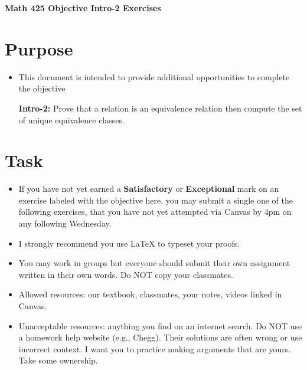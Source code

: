 \documentclass[12pt]{article}
\begin{document}
	\begin{center}
		{\Large \bf Math 425 Objective Intro-2 Exercises}
	\end{center}
	\section*{Purpose}
	\begin{itemize}
		\item This document is intended to provide additional opportunities to complete the objective
		
			\textbf{Intro-2:} Prove that a relation is an equivalence relation then compute the set of unique equivalence classes.

	\end{itemize}
	\section*{Task}
	\begin{itemize}
		\item If you have not yet earned a \textbf{Satisfactory} or \textbf{Exceptional} mark on an exercise labeled with the objective here, you may submit a single one of the following exercises, that you have not yet attempted via Canvas by 4pm on any following Wednesday.
		\item I strongly recommend you use LaTeX to typeset your proofs.
		\item You may work in groups but everyone should submit their own assignment written in their own words.  Do NOT copy your classmates.
		\item Allowed resources: our textbook, classmates, your notes, videos linked in Canvas.
		\item Unacceptable resources: anything you find on an internet search. Do NOT use a homework help website (e.g., Chegg). Their solutions are often wrong or use incorrect context.  I want you to practice making arguments that are yours. Take some ownership.
	\end{itemize}
\end{document}
